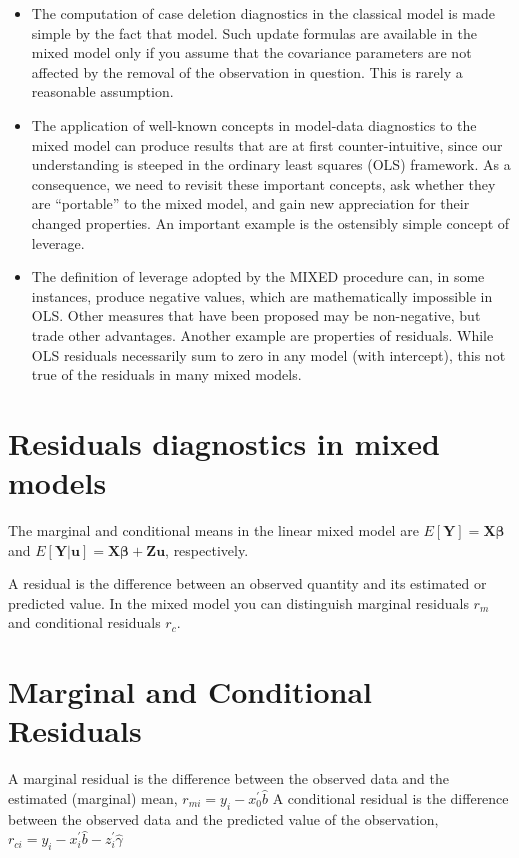 \documentclass[12pt, a4paper]{report}
\theoremstyle{plain}
\theoremstyle{definition}
\theoremstyle{remark}
\begin{document}
\begin{itemize}
		\item The computation of case deletion diagnostics in the classical model is made simple by the fact that
		model. Such update formulas are available in the mixed model only if you assume that the covariance
		parameters are not affected by the removal of the observation in question. This is rarely a reasonable
		assumption.
		\item The application of well-known concepts in model-data diagnostics to the mixed model can produce results
		that are at first counter-intuitive, since our understanding is steeped in the ordinary least squares
		(OLS) framework. As a consequence, we need to revisit these important concepts, ask whether they
		are “portable” to the mixed model, and gain new appreciation for their changed properties. An important
		example is the ostensibly simple concept of leverage. 
		\item The definition of leverage adopted by
		the MIXED procedure can, in some instances, produce negative values, which are mathematically
		impossible in OLS. Other measures that have been proposed may be non-negative, but trade other
		advantages. Another example are properties of residuals. While OLS residuals necessarily sum to
		zero in any model (with intercept), this not true of the residuals in many mixed models.
	\end{itemize}
	\newpage
	\section{Residuals diagnostics in mixed models}
	
	The marginal and conditional means in the linear mixed model are
	$E[\boldsymbol{Y}] = \boldsymbol{X}\boldsymbol{\beta}$ and
	$E[\boldsymbol{Y|\boldsymbol{u}}] = \boldsymbol{X}\boldsymbol{\beta} + \boldsymbol{Z}\boldsymbol{u}$, respectively.
	
	A residual is the difference between an observed quantity and its estimated or predicted value. In the mixed
	model you can distinguish marginal residuals $r_m$ and conditional residuals $r_c$. 
	
	
	\section{Marginal and Conditional Residuals}
	
	A marginal residual is the difference between the observed data and the estimated (marginal) mean, $r_{mi} = y_i - x_0^{\prime} \hat{b}$
	A conditional residual is the difference between the observed data and the predicted value of the observation,
	$r_{ci} = y_i - x_i^{\prime} \hat{b} - z_i^{\prime} \hat{\gamma}$
	
\end{document}
